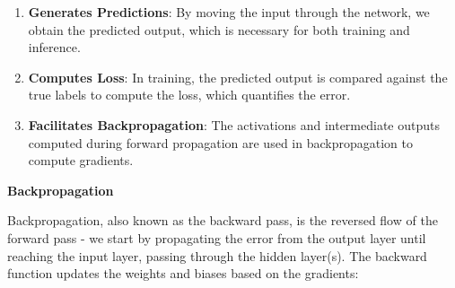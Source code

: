 \begin{enumerate}
    \item {\bf Generates Predictions}: By moving the input through the network, we obtain
the predicted output, which is necessary for both training and inference.

    \item {\bf Computes Loss}: In training, the predicted output is compared against the
true labels to compute the loss, which quantifies the error.

    \item {\bf Facilitates Backpropagation}: The activations and intermediate outputs
computed during forward propagation are used in backpropagation to compute
gradients.
\end{enumerate}

\vspace{5mm}
{\noindent\huge\bf Backpropagation}
\vspace{5mm}

Backpropagation, also known as the backward pass, is the reversed flow of the
forward pass - we start by propagating the error from the output layer until
reaching the input layer, passing through the hidden layer(s). The backward
function updates the weights and biases based on the gradients:

